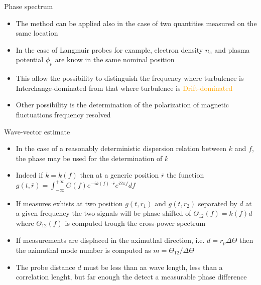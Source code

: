 \documentclass[t,10pt]{beamer}
\begin{document}
\begin{frame}{Phase spectrum}
\begin{itemize}[<+->]
\item The method can be applied also in the case of two quantities
  measured on the same location
\item In the case of Langmuir probes for example, electron density
  $n_e$ and plasma potential $\phi_p$ are know in the same nominal
  position


\item This allow the possibility to distinguish the frequency where
  turbulence is \textcolor{rfxcyan}{Interchange-dominated} from that
  where turbulence is \textcolor{orange}{Drift-dominated}
\item Other possibility is the determination of the polarization of
  magnetic fluctuations frequency resolved 
\end{itemize}
\end{frame}

\begin{frame}{Wave-vector estimate}
\begin{itemize}[<+-|alert@+>]
\item In the case of a reasonably deterministic dispersion relation between $k$ and $f$, the phase may be
  used for the determination of $k$
\item Indeed if $k = k(f)$ then at a generic position $\overline{r}$
  the function $g(t,\overline{r}) =
  \int_{-\infty}^{+\infty}G(f)e^{-ik(f)\cdot \overline{r}}e^{i2\pi f}df$
\item If measures exhists at two position $g(t,\overline{r}_1)$ and
  $g(t,\overline{r}_2)$ separated by $d$ at a given frequency the two signals will be
  phase shifted of $\Theta_{12}(f)=k(f)d$ where $\Theta_{12}(f)$ is
  computed trough the cross-power spectrum
\item If measurements are displaced in the aximuthal direction,
  i.e. $d=r_p\Delta\Theta$ then the azimuthal mode number is computed
  as $m=\Theta_{12}/\Delta\Theta$
\item \textcolor{tachameleon}{The probe distance $d$ must be less than
  aa wave length, less than a correlation lenght, but far enough the
  detect a measurable phase difference}
\end{itemize}
\end{frame}
\end{document}
